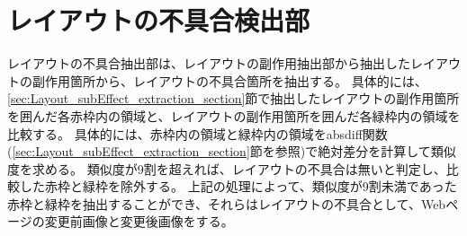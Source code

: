\section{レイアウトの不具合検出部}\label{sec:Layout_bug_extraction_section}
レイアウトの不具合抽出部は、レイアウトの副作用抽出部から抽出したレイアウトの副作用箇所から、レイアウトの不具合箇所を抽出する。
具体的には、\ref{sec:Layout_subEffect_extraction_section}節で抽出したレイアウトの副作用箇所を囲んだ各赤枠内の領域と、レイアウトの副作用箇所を囲んだ各緑枠内の領域を比較する。
具体的には、赤枠内の領域と緑枠内の領域をabsdiff関数(\ref{sec:Layout_subEffect_extraction_section}節を参照)で絶対差分を計算して類似度を求める。
類似度が9割を超えれば、レイアウトの不具合は無いと判定し、比較した赤枠と緑枠を除外する。
上記の処理によって、類似度が9割未満であった赤枠と緑枠を抽出することができ、それらはレイアウトの不具合として、Webページの変更前画像と変更後画像をする。









